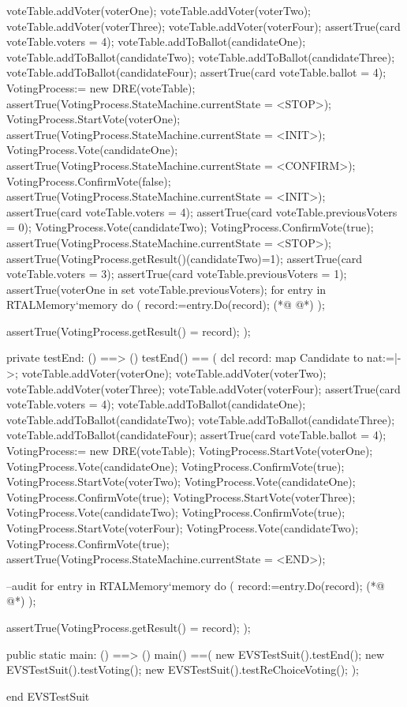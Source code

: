 \begin{vdmpp}
 voteTable.addVoter(voterOne);
 voteTable.addVoter(voterTwo);
 voteTable.addVoter(voterThree);
 voteTable.addVoter(voterFour);
 assertTrue(card voteTable.voters = 4);
 voteTable.addToBallot(candidateOne);
 voteTable.addToBallot(candidateTwo);
 voteTable.addToBallot(candidateThree);
 voteTable.addToBallot(candidateFour);
 assertTrue(card voteTable.ballot = 4);
 VotingProcess:= new DRE(voteTable);
 assertTrue(VotingProcess.StateMachine.currentState = <STOP>);
 VotingProcess.StartVote(voterOne);
 assertTrue(VotingProcess.StateMachine.currentState = <INIT>);
 VotingProcess.Vote(candidateOne);
 assertTrue(VotingProcess.StateMachine.currentState = <CONFIRM>);
 VotingProcess.ConfirmVote(false);
 assertTrue(VotingProcess.StateMachine.currentState = <INIT>);
 assertTrue(card voteTable.voters = 4);
 assertTrue(card voteTable.previousVoters = 0);
 VotingProcess.Vote(candidateTwo);
 VotingProcess.ConfirmVote(true);
 assertTrue(VotingProcess.StateMachine.currentState = <STOP>);
 assertTrue(VotingProcess.getResult()(candidateTwo)=1);
 assertTrue(card voteTable.voters = 3);
 assertTrue(card voteTable.previousVoters = 1);
 assertTrue(voterOne in set voteTable.previousVoters);
 for entry in RTALMemory`memory 
  do (
    record:=entry.Do(record);
(*@
\label{testEnd:91}
@*)
  );
   
  assertTrue(VotingProcess.getResult() = record);
);

private testEnd: () ==> ()
testEnd() ==
( 
 dcl record: map Candidate to nat:={|->};
 voteTable.addVoter(voterOne);
 voteTable.addVoter(voterTwo);
 voteTable.addVoter(voterThree);
 voteTable.addVoter(voterFour);
 assertTrue(card voteTable.voters = 4);
 voteTable.addToBallot(candidateOne);
 voteTable.addToBallot(candidateTwo);
 voteTable.addToBallot(candidateThree);
 voteTable.addToBallot(candidateFour);
 assertTrue(card voteTable.ballot = 4);
 VotingProcess:= new DRE(voteTable);
 VotingProcess.StartVote(voterOne);
 VotingProcess.Vote(candidateOne);
 VotingProcess.ConfirmVote(true);
 VotingProcess.StartVote(voterTwo);
 VotingProcess.Vote(candidateOne);
 VotingProcess.ConfirmVote(true);
 VotingProcess.StartVote(voterThree);
 VotingProcess.Vote(candidateTwo);
 VotingProcess.ConfirmVote(true);
 VotingProcess.StartVote(voterFour);
 VotingProcess.Vote(candidateTwo);
 VotingProcess.ConfirmVote(true);
 assertTrue(VotingProcess.StateMachine.currentState = <END>);
 
 --audit
 for entry in RTALMemory`memory 
  do (
    record:=entry.Do(record);
(*@
\label{main:129}
@*)
  );
   
  assertTrue(VotingProcess.getResult() = record);
);

public static main: () ==> ()
main() ==(
 new EVSTestSuit().testEnd();
 new EVSTestSuit().testVoting();
 new EVSTestSuit().testReChoiceVoting();
);

end EVSTestSuit
\end{vdmpp}
